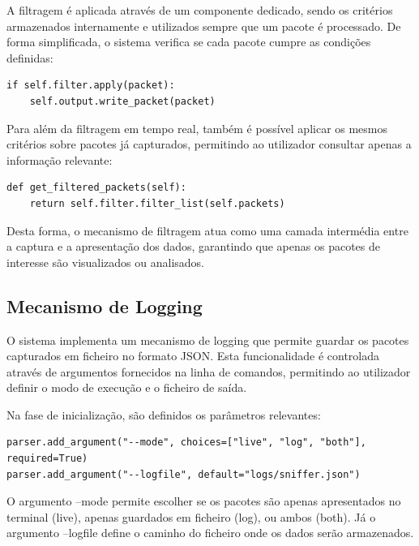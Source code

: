 \documentclass[a4paper]{article}
\begin{document}
A filtragem é aplicada através de um componente dedicado, sendo os critérios armazenados internamente e utilizados sempre que um pacote é processado. De forma simplificada, o sistema verifica se cada pacote cumpre as condições definidas:

\vspace{0.15cm}
\begin{lstlisting}
if self.filter.apply(packet):
    self.output.write_packet(packet)
\end{lstlisting}
\vspace{0.15cm}

Para além da filtragem em tempo real, também é possível aplicar os mesmos critérios sobre pacotes já capturados, permitindo ao utilizador consultar apenas a informação relevante:

\vspace{0.15cm}
\begin{lstlisting}
def get_filtered_packets(self):
    return self.filter.filter_list(self.packets)
\end{lstlisting}
\vspace{0.15cm}

Desta forma, o mecanismo de filtragem atua como uma camada intermédia entre a captura e a apresentação dos dados, garantindo que apenas os pacotes de interesse são visualizados ou analisados.

\subsection{Mecanismo de Logging}
O sistema implementa um mecanismo de logging que permite guardar os pacotes capturados em ficheiro no formato JSON. Esta funcionalidade é controlada através de argumentos fornecidos na linha de comandos, permitindo ao utilizador definir o modo de execução e o ficheiro de saída.

Na fase de inicialização, são definidos os parâmetros relevantes:

\vspace{0.15cm}
\begin{lstlisting}
parser.add_argument("--mode", choices=["live", "log", "both"], required=True)
parser.add_argument("--logfile", default="logs/sniffer.json")
\end{lstlisting}
\vspace{0.15cm}

O argumento --mode permite escolher se os pacotes são apenas apresentados no terminal (live), apenas guardados em ficheiro (log), ou ambos (both). Já o argumento --logfile define o caminho do ficheiro onde os dados serão armazenados.
\end{document}
